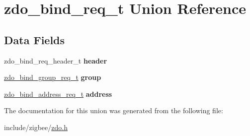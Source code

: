 \hypertarget{unionzdo__bind__req__t}{\section{zdo\-\_\-bind\-\_\-req\-\_\-t Union Reference}
\label{unionzdo__bind__req__t}
}
\subsection*{Data Fields}
\begin{DoxyCompactItemize}
\item 
\hypertarget{group__zdo_ga5a520a3fd94801faed2b25261d8cf244}{zdo\-\_\-bind\-\_\-req\-\_\-header\-\_\-t {\bfseries header}}\label{group__zdo_ga5a520a3fd94801faed2b25261d8cf244}

\item 
\hypertarget{group__zdo_gabb9332f3f72154b4e8aa79f4cd615dbf}{\hyperlink{group__zdo_ga41ab3318ee2bd538e044d6d6e101f376}{zdo\-\_\-bind\-\_\-group\-\_\-req\-\_\-t} {\bfseries group}}\label{group__zdo_gabb9332f3f72154b4e8aa79f4cd615dbf}

\item 
\hypertarget{group__zdo_gaeb044cdc1535cba42db0c32a6b116ad2}{\hyperlink{group__zdo_ga68c283a043714a9e40d3674146dd6239}{zdo\-\_\-bind\-\_\-address\-\_\-req\-\_\-t} {\bfseries address}}\label{group__zdo_gaeb044cdc1535cba42db0c32a6b116ad2}

\end{DoxyCompactItemize}


The documentation for this union was generated from the following file\-:\begin{DoxyCompactItemize}
\item 
include/zigbee/\hyperlink{zdo_8h}{zdo.\-h}\end{DoxyCompactItemize}
